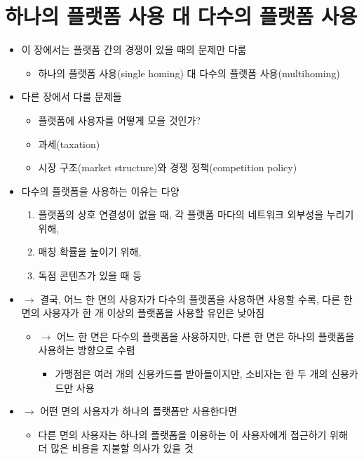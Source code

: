 \section{하나의 플랫폼 사용 대 다수의 플랫폼 사용}
\begin{itemize}
\item 이 장에서는 플랫폼 간의 경쟁이 있을 때의 문제만 다룸
	\begin{itemize}
	\item 하나의 플랫폼 사용(single homing) 대 다수의 플랫폼 사용(multihoming)
	\end{itemize}
\item 다른 장에서 다룰 문제들
	\begin{itemize}
	\item 플랫폼에 사용자를 어떻게 모을 것인가? %
	\item 과세(taxation) %
	\item 시장 구조(market structure)와 경쟁 정책(competition policy) %
	\end{itemize}
\item 다수의 플랫폼을 사용하는 이유는 다양
	\begin{enumerate}
	\item 플랫폼의 상호 연결성이 없을 때, 각 플랫폼 마다의 네트워크 외부성을 누리기 위해,
	\item 매칭 확률을 높이기 위해,
	\item 독점 콘텐츠가 있을 때 등
	\end{enumerate}
\item $\rightarrow$ 결국, 어느 한 면의 사용자가 다수의 플랫폼을 사용하면 사용할 수록, 다른 한 면의 사용자가 한 개 이상의 플랫폼을 사용할 유인은 낮아짐
	\begin{itemize}
	\item $\rightarrow$ 어느 한 면은 다수의 플랫폼을 사용하지만, 다른 한 면은 하나의 플랫폼을 사용하는 방향으로 수렴
		\begin{itemize}
		\item 가맹점은 여러 개의 신용카드를 받아들이지만, 소비자는 한 두 개의 신용카드만 사용
		\end{itemize}
	\end{itemize}
\item $\rightarrow$ 어떤 면의 사용자가 하나의 플랫폼만 사용한다면
	\begin{itemize}
	\item 다른 면의 사용자는 하나의 플랫폼을 이용하는 이 사용자에게 접근하기 위해 더 많은 비용을 지불할 의사가 있을 것

\end{itemize}
\end{itemize}
